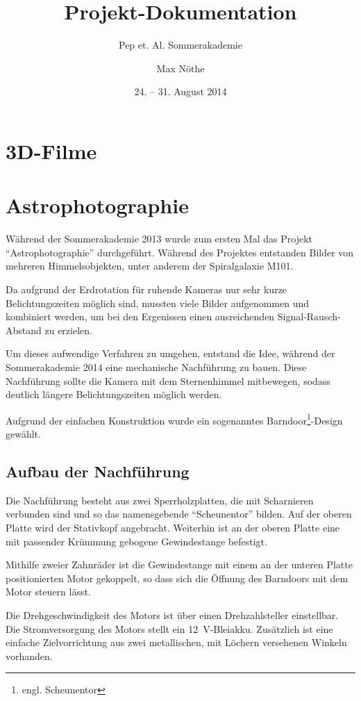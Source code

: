 \documentclass[
  bibliography=totoc,     %
  captions=tableheading,  %
  titlepage=firstiscover, %
  twocolumn,
]{scrartcl}
\title{Projekt-Dokumentation}
\subtitle{Pep et. Al. Sommerakademie}
\date{24. -- 31. August 2014}
\author{Max Nöthe}
\begin{document}
\maketitle
\tableofcontents

\section{3D-Filme}

\section{Astrophotographie}

Während der Sommerakademie 2013 wurde zum ersten Mal das Projekt \enquote{Astrophotographie} durchgeführt.
Während des Projektes entstanden Bilder von mehreren Himmelsobjekten, unter anderem der Spiralgalaxie M101.

Da aufgrund der Erdrotation für ruhende Kameras nur sehr kurze Belichtungszeiten möglich sind, mussten viele Bilder aufgenommen und kombiniert werden, 
um bei den Ergenissen einen ausreichenden Signal-Rausch-Abstand zu erzielen.

Um dieses aufwendige Verfahren zu umgehen, entstand die Idee, während der
Sommerakademie 2014 eine mechanische Nachführung zu bauen.
Diese Nachführung sollte die Kamera mit dem Sternenhimmel mitbewegen, sodass deutlich längere Belichtungszeiten möglich werden.

Aufgrund der einfachen Konstruktion wurde ein sogenanntes
Barndoor\footnote{engl. Scheunentor}-Design gewählt.

\subsection{Aufbau der Nachführung}

Die Nachführung besteht aus zwei Sperrholzplatten, die mit Scharnieren verbunden sind und so das namensgebende \enquote{Scheunentor} bilden.
Auf der oberen Platte wird der Stativkopf angebracht.
Weiterhin ist an der oberen Platte eine mit passender Krümmung gebogene Gewindestange befestigt.

Mithilfe zweier Zahnräder ist die Gewindestange mit einem an der unteren Platte positionierten Motor gekoppelt, so dass sich die Öffnung des Barndoors mit dem Motor steuern lässt.

Die Drehgeschwindigkeit des Motors ist über einen Drehzahlsteller einstellbar.
Die Stromversorgung des Motors stellt ein \SI{12}{\volt}-Bleiakku.
Zusätzlich ist eine einfache Zielvorrichtung aus zwei metallischen, mit Löchern versehenen Winkeln vorhanden.
\end{document}
